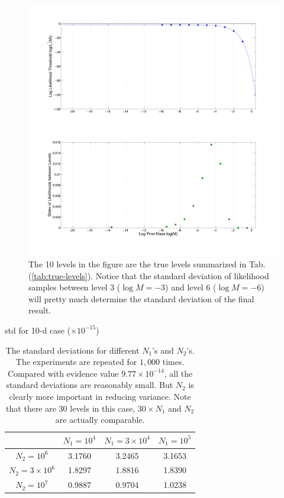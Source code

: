 \documentclass[letterpaper, preprint]{aastex}
\begin{document}
\begin{figure}[h]
 \includegraphics[width=0.99\linewidth]{stdev-between-gaps.pdf}
\caption{The 10 levels in the figure are the true levels summarized in Tab. (\ref{tab:true-levels}). Notice that the standard deviation of likelihood samples between level 3 ($\log{M} = -3$) and level 6 ($\log{M} = -6$) will pretty much determine the standard deviation of the final result.}
 \label{fig:level-var}
\end{figure}

\begin{table}[h]
\centering
std for 10-d case ($\times10^{-15}$)\\
\begin{tabular}{c|c|c|c}
\hline
 & $N_1=10^4$ & $N_1=3\times10^4$ & $N_1=10^5$\\
\hline
$N_2=10^6$                  & 3.1760  & 3.2465 & 3.1653 \\
$N_2=3\times10^6$ & 1.8297  & 1.8816 & 1.8390 \\
$N_2=10^7$                  & 0.9887  & 0.9704 &  1.0238\\
\hline
\end{tabular}
\caption{The standard deviations for different $N_1$'s and $N_2$'s. The experiments are repeated for $1,000$ times. Compared with evidence value $9.77\times10^{-14}$, all the standard deviations are reasonably small. But $N_2$ is clearly more important in reducing variance. Note that there are 30 levels in this case, $30\times N_1$ and $N_2$ are actually comparable.}
\label{tab:N1N2}
\end{table} 
\end{document}
